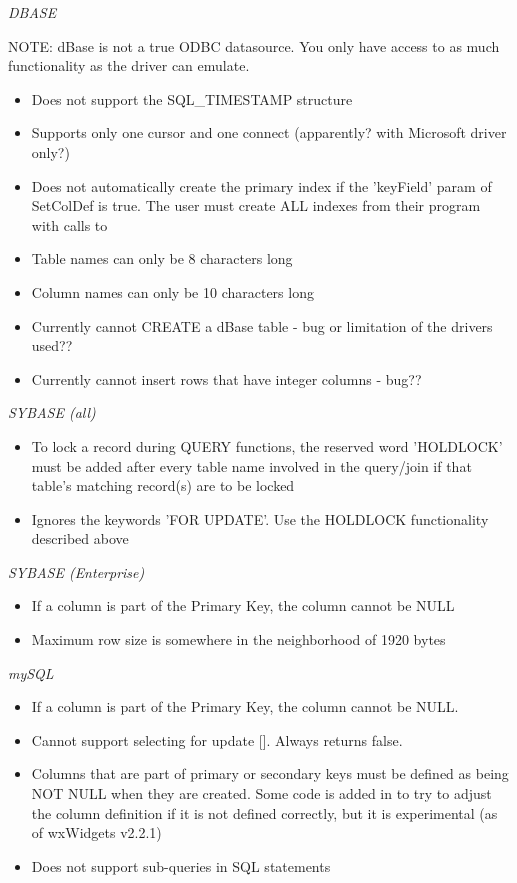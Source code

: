 {\it DBASE}

NOTE: dBase is not a true ODBC datasource. You only have access to as much 
functionality as the driver can emulate.

\begin{itemize}\itemsep=0pt
\item Does not support the SQL\_TIMESTAMP structure
\item Supports only one cursor and one connect (apparently? with Microsoft driver only?)
\item Does not automatically create the primary index if the 'keyField' param of SetColDef is true. The user must create ALL indexes from their program with calls to 
\item Table names can only be 8 characters long
\item Column names can only be 10 characters long
\item Currently cannot CREATE a dBase table - bug or limitation of the drivers used??
\item Currently cannot insert rows that have integer columns - bug??
\end{itemize}

{\it SYBASE (all)}
\begin{itemize}\itemsep=0pt
\item To lock a record during QUERY functions, the reserved word 'HOLDLOCK' must be added after every table name involved in the query/join if that table's matching record(s) are to be locked
\item Ignores the keywords 'FOR UPDATE'. Use the HOLDLOCK functionality described above
\end{itemize}

{\it SYBASE (Enterprise)}
\begin{itemize}\itemsep=0pt
\item If a column is part of the Primary Key, the column cannot be NULL
\item Maximum row size is somewhere in the neighborhood of 1920 bytes
\end{itemize}

{\it mySQL}
\begin{itemize}\itemsep=0pt
\item If a column is part of the Primary Key, the column cannot be NULL.
\item Cannot support selecting for update []. Always returns false.
\item Columns that are part of primary or secondary keys must be defined as being NOT NULL when they are created. Some code is added in  to try to adjust the column definition if it is not defined correctly, but it is experimental (as of wxWidgets v2.2.1)
\item Does not support sub-queries in SQL statements
\end{itemize}

